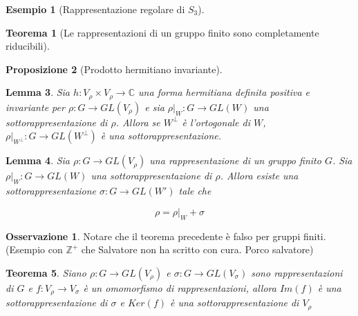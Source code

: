 \documentclass[11pt]{article}
\theoremstyle{plain}
\newtheorem{thm}{Teorema}[section]
\newtheorem{lemma}[thm]{Lemma}
\newtheorem{prop}[thm]{Proposizione}
\theoremstyle{definition}
\newtheorem{exmp}{Esempio}[section]
\newtheorem*{rem}{Osservazione}
\theoremstyle{remark}
\newcommand{\C}{\mathbb{C}}
\begin{document}
\begin{exmp}[Rappresentazione regolare di $S_3$]


\end{exmp}



\begin{thm}[Le rappresentazioni di un gruppo finito sono completamente riducibili]

\end{thm}

\begin{prop}[Prodotto hermitiano invariante]

\end{prop}


\begin{lemma}
Sia $h: V_\rho \times V_\rho \to \C$ una forma hermitiana definita positiva e invariante per $\rho: G \to GL(V_\rho)$ e sia $\rho|_W: G \to GL(W)$ una sottorappresentazione di $\rho$. Allora se $W^\perp$ è l'ortogonale di $W$, $\rho|_{W^\perp}: G \to GL(W^\perp)$ è una sottorappresentazione.




\end{lemma}






\begin{lemma}
Sia $\rho: G \to GL(V_\rho)$ una rappresentazione di un gruppo finito $G$. Sia $\rho|_W: G \to GL(W)$ una sottorappresentazione di $\rho$. Allora esiste una sottorappresentazione $\sigma: G \to GL(W')$ tale che

\[\rho = \rho|_W + \sigma \]
\end{lemma}






\begin{rem} Notare che il teorema precedente è falso per gruppi finiti. (Esempio con $\mathbb{Z}^+$ che Salvatore non ha scritto con cura. Porco salvatore)



\end{rem}



\begin{thm} Siano $\rho: G \to GL(V_\rho)$ e $\sigma: G \to GL(V_\sigma)$ sono rappresentazioni di $G$ e $f: V_\rho \to V_\sigma$ è un omomorfismo di rappresentazioni, allora $Im(f)$ è una sottorappresentazione di $\sigma$ e $Ker(f)$ è una sottorappresentazione di $V_\rho$

\end{thm}
\end{document}
